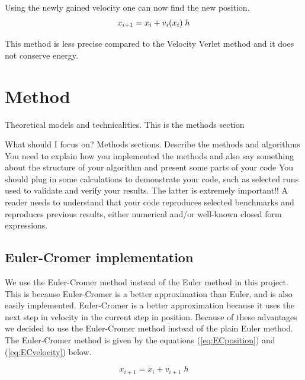 \documentclass{article}
\begin{document}
    Using the newly gained velocity one can now find the new position. \\

    \begin{equation}    \label{eq:Eposition}
        x_{i+1} = x_i +  v_{i}(x_i) \; h \\
    \end{equation}

    This method is less precise compared to the Velocity Verlet method and it does not conserve energy. \\


\vspace{1cm}

\section{Method} \label{sec:Method}

Theoretical models and technicalities. This is the methods section


What should I focus on? Methods sections.
Describe the methods and algorithms
You need to explain how you implemented the methods and also say something about the structure of your algorithm and present some parts of your code
You should plug in some calculations to demonstrate your code, such as selected runs used to validate and verify your results. The latter is extremely important!! A reader needs to understand that your code reproduces selected benchmarks and reproduces previous results, either numerical and/or well-known closed form expressions.

\subsection{Euler-Cromer implementation}    \label{sec:eulercromer}

    We use the Euler-Cromer method instead of the Euler method in this project. This is because Euler-Cromer is a better approximation than Euler, and is also easily implemented. Euler-Cromer is a better approximation because it uses the next step in velocity in the current step in position. Because of these advantages we decided to use the Euler-Cromer method instead of the plain Euler method. The Euler-Cromer method is given by the equations (\ref{eq:ECposition}) and (\ref{eq:ECvelocity}) below.

    \begin{equation}    \label{eq:ECposition}
        x_{i+1} = x_i + v_{i+1} \; h
    \end{equation} \\
\end{document}
